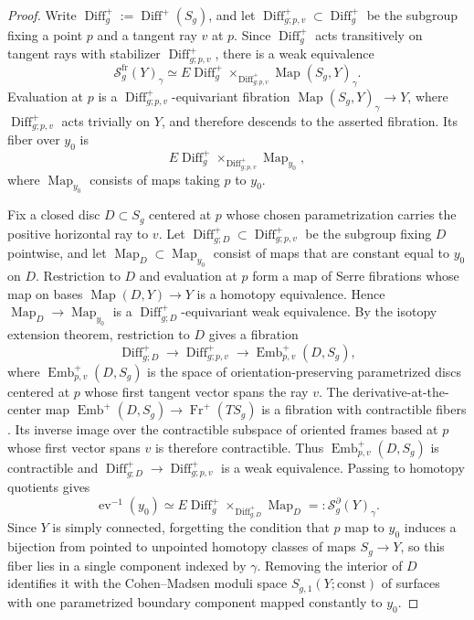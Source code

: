 \documentclass[11pt,reqno]{amsart}
\theoremstyle{plain} %
\theoremstyle{definition}
\DeclareMathOperator{\Diff}{Diff}
\DeclareMathOperator{\Map}{Map}
\DeclareMathOperator{\ev}{ev}
\newcommand{\Sc}{\mathcal{S}}
\begin{document}
\begin{proof}
Write $\Diff_g^+:=\Diff^+(S_g)$, and let $\Diff^+_{g;p,v}\subset \Diff_g^+$ be the subgroup fixing a point $p$ and a tangent ray $v$ at $p$. Since $\Diff_g^+$ acts transitively on tangent rays with stabilizer $\Diff^+_{g;p,v}$, there is a weak equivalence
\[
\Sc^{\mathrm{fr}}_g(Y)_\gamma\simeq E\Diff_g^+\times_{\Diff^+_{g;p,v}}\Map(S_g,Y)_\gamma.
\]
Evaluation at $p$ is a $\Diff^+_{g;p,v}$-equivariant fibration $\Map(S_g,Y)_\gamma\to Y$, where $\Diff^+_{g;p,v}$ acts trivially on $Y$, and therefore descends to the asserted fibration. Its fiber over $y_0$ is
\[
E\Diff_g^+\times_{\Diff^+_{g;p,v}}\Map_{y_0},
\]
where $\Map_{y_0}$ consists of maps taking $p$ to $y_0$.

Fix a closed disc $D\subset S_g$ centered at $p$ whose chosen parametrization carries the positive horizontal ray to $v$. Let $\Diff^+_{g;D}\subset \Diff^+_{g;p,v}$ be the subgroup fixing $D$ pointwise, and let $\Map_D\subset\Map_{y_0}$ consist of maps that are constant equal to $y_0$ on $D$. Restriction to $D$ and evaluation at $p$ form a map of Serre fibrations whose map on bases $\Map(D,Y)\to Y$ is a homotopy equivalence. Hence $\Map_D\to\Map_{y_0}$ is a $\Diff^+_{g;D}$-equivariant weak equivalence. By the isotopy extension theorem, restriction to $D$ gives a fibration
\[
\Diff^+_{g;D}\longrightarrow \Diff^+_{g;p,v}\longrightarrow \operatorname{Emb}^+_{p,v}(D,S_g),
\]
where $\operatorname{Emb}^+_{p,v}(D,S_g)$ is the space of orientation-preserving parametrized discs centered at $p$ whose first tangent vector spans the ray $v$. The derivative-at-the-center map $\operatorname{Emb}^+(D,S_g)\to\operatorname{Fr}^+(TS_g)$ is a fibration with contractible fibers \cite[proof of Proposition~11.2]{RW-resolutions}. Its inverse image over the contractible subspace of oriented frames based at $p$ whose first vector spans $v$ is therefore contractible. Thus $\operatorname{Emb}^+_{p,v}(D,S_g)$ is contractible and $\Diff^+_{g;D}\to \Diff^+_{g;p,v}$ is a weak equivalence. Passing to homotopy quotients gives
\[
\ev^{-1}(y_0)\simeq E\Diff_g^+\times_{\Diff^+_{g;D}}\Map_D=: \Sc^{\partial}_g(Y)_\gamma.
\]
Since $Y$ is simply connected, forgetting the condition that $p$ map to $y_0$ induces a bijection from pointed to unpointed homotopy classes of maps $S_g\to Y$, so this fiber lies in a single component indexed by $\gamma$. Removing the interior of $D$ identifies it with the Cohen--Madsen moduli space $S_{g,1}(Y;\mathrm{const})$ of surfaces with one parametrized boundary component mapped constantly to $y_0$.
\end{proof}
\end{document}
